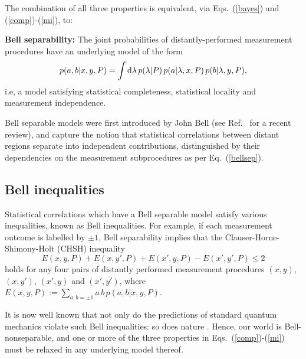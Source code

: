 \documentclass[graybox]{svmult}
\begin{document}
The combination of all three properties is equivalent, via Eqs.~(\ref{bayes}) and (\ref{comp})-(\ref{mi}), to:
\begin{svgraybox} {\bf Bell separability:} The joint probabilities of distantly-performed measurement procedures have an underlying model of the form
\begin{equation} \label{bellsep}
p(a,b|x,y,P) = \int \D \lambda\, p(\lambda|P)\,p(a|\lambda,x,P) \,p(b|\lambda,y,P) ,
\end{equation}
i.e, a model satisfying statistical completeness, statistical locality and measurement independence.
\end{svgraybox}
Bell separable models were first introduced by John Bell \cite{bell} (see Ref.~\cite{wiseman} for a recent review), and capture the notion that statistical correlations between distant regions separate into independent contributions, distinguished by their dependencies on the measurement subprocedures as per Eq.~(\ref{bellsep}). %

\subsection{Bell inequalities}

Statistical correlations which have a Bell separable model satisfy various inequalities, known as Bell inequalities.  For example, if each measurement outcome is labelled by $\pm1$,  Bell separability implies that the Clauser-Horne-Shimony-Holt (CHSH) inequality \cite{chsh}
\begin{equation}
E(x,y,P) + E(x,y',P) + E(x',y,P) - E(x',y',P) \leq 2
\end{equation}
holds for any four pairs of distantly performed measurement procedures $(x,y)$, $(x,y')$, $(x',y)$ and $(x',y')$, where $E(x,y,P):=\sum_{a,b=\pm1} a\,b\,p(a,b|x,y,P)$.

It is now well known that not only do the predictions of standard quantum mechanics violate such Bell inequalities: so does nature \cite{aspect,hansen}.  Hence, our world is Bell-nonseparable, and one or more of the  three properties in Eqs.~(\ref{comp})-(\ref{mi}) must be relaxed in any underlying model thereof.
\end{document}
